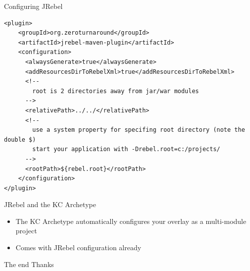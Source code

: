 \documentclass[xcolor=dvipsnames,14pt,professionalfonts]{beamer}
\begin{document}
\begin{frame}[fragile]{Configuring JRebel}
  \begin{verbatim}
<plugin>
    <groupId>org.zeroturnaround</groupId>
    <artifactId>jrebel-maven-plugin</artifactId>
    <configuration>
      <alwaysGenerate>true</alwaysGenerate>
      <addResourcesDirToRebelXml>true</addResourcesDirToRebelXml>
      <!--
        root is 2 directories away from jar/war modules
      -->
      <relativePath>../../</relativePath>
      <!--
        use a system property for specifing root directory (note the double $)
        start your application with -Drebel.root=c:/projects/
      -->
      <rootPath>${rebel.root}</rootPath>
    </configuration>
</plugin>
    \end{verbatim}
\end{frame}

\begin{frame}{JRebel and the KC Archetype}
\begin{itemize}
  \item The KC Archetype automatically configures your overlay as a multi-module project
  \item Comes with JRebel configuration already
\end{itemize}
\end{frame}

\begin{frame}{The end}
Thanks
\end{frame}
\end{document}
